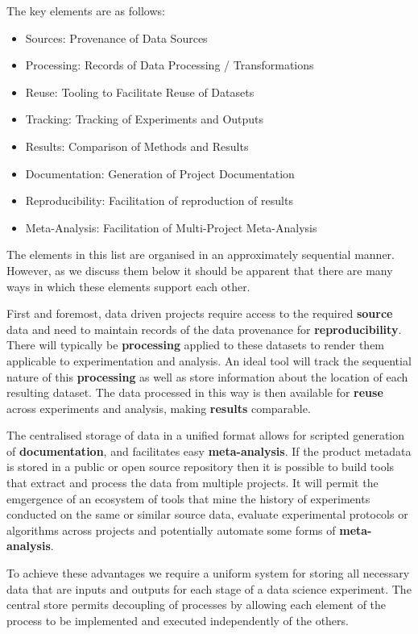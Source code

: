 \documentclass[sigconf]{acmart}
\begin{document}
The key elements are as follows:

\begin{itemize}
 \item Sources: Provenance of Data Sources
 \item Processing: Records of Data Processing / Transformations
 \item Reuse: Tooling to Facilitate Reuse of Datasets
 \item Tracking: Tracking of Experiments and Outputs
 \item Results: Comparison of Methods and Results
 \item Documentation: Generation of Project Documentation
 \item Reproducibility: Facilitation of reproduction of results
 \item Meta-Analysis: Facilitation of Multi-Project Meta-Analysis
\end{itemize}

The elements in this list are organised in an approximately sequential manner. 
However, as we discuss them below it should be apparent that there are many ways 
in which these elements support each other.

First and foremost, data driven projects require access to the required \textbf{source} data 
and need to maintain records of the data provenance for \textbf{reproducibility}. 
There will typically be \textbf{processing} applied to these datasets to 
render them applicable to experimentation and analysis. An ideal tool will track the 
sequential nature of this \textbf{processing} as well as store information about 
the location of each resulting dataset. The data processed in this way is then 
available for \textbf{reuse} across experiments and analysis,
making \textbf{results} comparable.

The centralised storage of data in a unified format allows for scripted generation 
of \textbf{documentation}, and facilitates easy \textbf{meta-analysis}. If the 
product metadata is stored in a public or open source repository then it is 
possible to build tools that extract and process the data from multiple projects. It
will permit the emgergence of an ecosystem of tools that mine the history of 
experiments conducted on the same or similar source data, evaluate experimental 
protocols or algorithms across projects and potentially
automate some forms of \textbf{meta-analysis}.
 
To achieve these advantages we require a uniform system for storing all necessary 
data that are inputs and outputs for each stage of a data science experiment. 
The central store permits decoupling of processes by allowing each
element of the process to be implemented and executed independently of the others.
\end{document}
